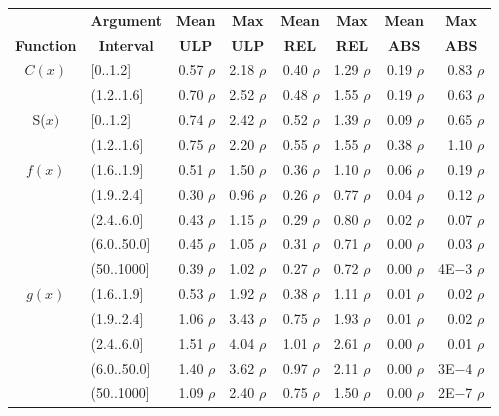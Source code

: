 \documentclass[twoside]{MATH77}
\begin{document}
\begin{table*}
\begin{center}
\begin{tabular}{cl*{6}{r}}
& \multicolumn{1}{c}{\bf Argument} & \multicolumn{1}{c}{\bf Mean} &
\multicolumn{1}{c}{\bf Max} & \multicolumn{1}{c}{\bf Mean} &
\multicolumn{1}{c}{\bf Max} & \multicolumn{1}{c}{\bf Mean} &
\multicolumn{1}{c}{\bf Max}\\
{\bf Function} & \multicolumn{1}{c}{\bf Interval} &
\multicolumn{1}{c}{\bf ULP} & \multicolumn{1}{c}{\bf ULP} &
\multicolumn{1}{c}{\bf REL} & \multicolumn{1}{c}{\bf REL} &
\multicolumn{1}{c}{\bf ABS} & \multicolumn{1}{c}{\bf ABS}\\
$C(x)$ & [0..1.2] & 0.57 $\rho $ & 2.18 $\rho $ & 0.40 $\rho $ &
1.29 $\rho $ & 0.19 $\rho $ & 0.83 $\rho $\\
& (1.2..1.6] & 0.70 $\rho $ & 2.52 $\rho $ & 0.48 $\rho $ &
1.55 $\rho $ & 0.19 $\rho $ & 0.63 $\rho $\\
S($x)$ & [0..1.2] & 0.74 $\rho $ & 2.42 $\rho $ & 0.52 $\rho $ &
1.39 $\rho $ & 0.09 $\rho $ & 0.65 $\rho $\\
& (1.2..1.6] & 0.75 $\rho $ & 2.20 $\rho $ & 0.55 $\rho $ &
1.55 $\rho $ & 0.38 $\rho $ & 1.10 $\rho $\\
$f(x)$ & (1.6..1.9] & 0.51 $\rho $ & 1.50 $\rho $ & 0.36 $\rho $ &
1.10 $\rho $ & 0.06 $\rho $ & 0.19 $\rho $\\
& (1.9..2.4] & 0.30 $\rho $ & 0.96 $\rho $ & 0.26 $\rho $ &
0.77 $\rho $ & 0.04 $\rho $ & 0.12 $\rho $\\
& (2.4..6.0] & 0.43 $\rho $ & 1.15 $\rho $ & 0.29 $\rho $ &
0.80 $\rho $ & 0.02 $\rho $ & 0.07 $\rho $\\
& (6.0..50.0] & 0.45 $\rho $ & 1.05 $\rho $ & 0.31 $\rho $ &
0.71 $\rho $ & 0.00 $\rho $ & 0.03 $\rho $\\
& (50..1000] & 0.39 $\rho $ & 1.02 $\rho $ & 0.27 $\rho $ &
0.72 $\rho $ & 0.00 $\rho $ & 4E$-$3 $\rho $\\
$g(x)$ & (1.6..1.9] & 0.53 $\rho $ & 1.92 $\rho $ & 0.38 $\rho $ &
1.11 $\rho $ & 0.01 $\rho $ & 0.02 $\rho $\\
& (1.9..2.4] & 1.06 $\rho $ & 3.43 $\rho $ & 0.75 $\rho $ &
1.93 $\rho $ & 0.01 $\rho $ & 0.02 $\rho $\\
& (2.4..6.0] & 1.51 $\rho $ & 4.04 $\rho $ & 1.01 $\rho $ &
2.61 $\rho $ & 0.00 $\rho $ & 0.01 $\rho $\\
& (6.0..50.0] & 1.40 $\rho $ & 3.62 $\rho $ & 0.97 $\rho $ &
2.11 $\rho $ & 0.00 $\rho $ & 3E$-$4 $\rho $\\
& (50..1000] & 1.09 $\rho $ & 2.40 $\rho $ & 0.75 $\rho $ &
1.50 $\rho $ & 0.00 $\rho $ & 2E$-$7 $\rho $
\end{tabular}
\end{center}
\end{table*}
\end{document}

